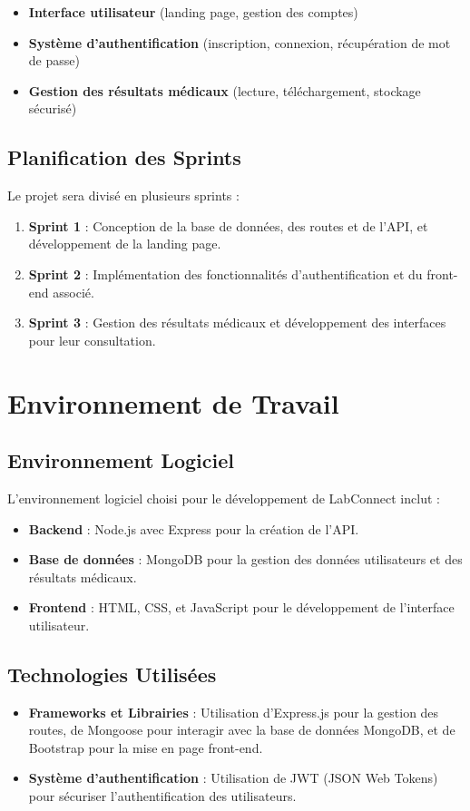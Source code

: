 \documentclass[12pt,a4paper]{report}
\begin{document}
\begin{itemize}
    \item \textbf{Interface utilisateur} (landing page, gestion des comptes)
    \item \textbf{Système d'authentification} (inscription, connexion, récupération de mot de passe)
    \item \textbf{Gestion des résultats médicaux} (lecture, téléchargement, stockage sécurisé)
\end{itemize}

\subsection{Planification des Sprints}
Le projet sera divisé en plusieurs sprints :

\begin{enumerate}
    \item \textbf{Sprint 1} : Conception de la base de données, des routes et de l'API, et développement de la landing page.
    \item \textbf{Sprint 2} : Implémentation des fonctionnalités d'authentification et du front-end associé.
    \item \textbf{Sprint 3} : Gestion des résultats médicaux et développement des interfaces pour leur consultation.
\end{enumerate}

\section{Environnement de Travail}

\subsection{Environnement Logiciel}
L'environnement logiciel choisi pour le développement de LabConnect inclut :

\begin{itemize}
    \item \textbf{Backend} : Node.js avec Express pour la création de l'API.
    \item \textbf{Base de données} : MongoDB pour la gestion des données utilisateurs et des résultats médicaux.
    \item \textbf{Frontend} : HTML, CSS, et JavaScript pour le développement de l'interface utilisateur.
\end{itemize}

\subsection{Technologies Utilisées}
\begin{itemize}
    \item \textbf{Frameworks et Librairies} : Utilisation d'Express.js pour la gestion des routes, de Mongoose pour interagir avec la base de données MongoDB, et de Bootstrap pour la mise en page front-end.
    \item \textbf{Système d'authentification} : Utilisation de JWT (JSON Web Tokens) pour sécuriser l'authentification des utilisateurs.
\end{itemize}
\end{document}

